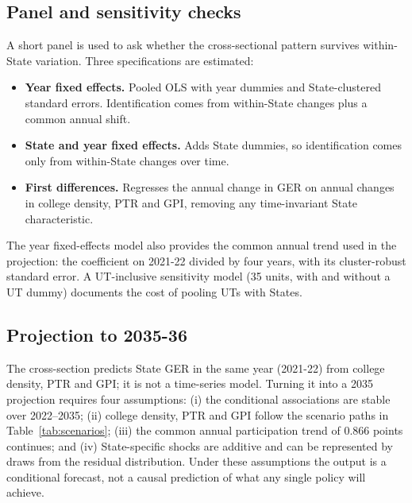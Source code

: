 \subsection{Panel and sensitivity checks}

A short panel is used to ask whether the cross-sectional pattern survives within-State variation. Three specifications are estimated:

\begin{itemize}
  \item \textbf{Year fixed effects.} Pooled OLS with year dummies and State-clustered standard errors. Identification comes from within-State changes plus a common annual shift.
  \item \textbf{State and year fixed effects.} Adds State dummies, so identification comes only from within-State changes over time.
  \item \textbf{First differences.} Regresses the annual change in GER on annual changes in college density, PTR and GPI, removing any time-invariant State characteristic.
\end{itemize}

The year fixed-effects model also provides the common annual trend used in the projection: the coefficient on 2021-22 divided by four years, with its cluster-robust standard error. A UT-inclusive sensitivity model (35 units, with and without a UT dummy) documents the cost of pooling UTs with States.

\subsection{Projection to 2035-36}\label{sec:projection}

The cross-section predicts State GER in the same year (2021-22) from college density, PTR and GPI; it is not a time-series model. Turning it into a 2035 projection requires four assumptions: (i) the conditional associations are stable over 2022--2035; (ii) college density, PTR and GPI follow the scenario paths in Table~\ref{tab:scenarios}; (iii) the common annual participation trend of 0.866 points continues; and (iv) State-specific shocks are additive and can be represented by draws from the residual distribution. Under these assumptions the output is a conditional forecast, not a causal prediction of what any single policy will achieve.

